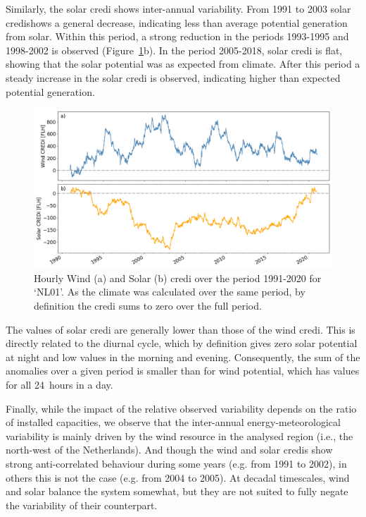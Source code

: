 \documentclass[a4paper,11pt]{extarticle}
\newcommand{\credi}[0]{{\sc credi}}
\newcommand{\sdi}[0]{{\sc solar credi}}
\newcommand{\wdi}[0]{{\sc wind credi}}
\begin{document}
Similarly, the \sdi{} shows inter-annual variability. 
From 1991 to 2003 \sdi shows a general decrease, indicating less than average potential generation from solar. 
Within this period, a strong reduction in the periods 1993-1995 and 1998-2002 is observed (Figure~\ref{fig:analysis_decadal}b). 
In the period 2005-2018, \sdi{} is flat, showing that the solar potential was as expected from climate. 
After this period a steady increase in the \sdi{} is observed, indicating higher than expected potential generation.

\begin{figure}[ht]
        \centering
        \includegraphics[width=\textwidth]{CREDI_interannual}
        \caption{
                Hourly Wind (a) and Solar (b) \credi{} over the period 1991-2020 for `NL01'. 
                As the climate was calculated over the same period, by definition the \credi{} sums to zero over the full period.}
        \label{fig:analysis_decadal}
\end{figure}

The values of \sdi{} are generally lower than those of the \wdi{}. 
This is directly related to the diurnal cycle, which by definition gives zero solar potential at night and low values in the morning and evening. 
Consequently, the sum of the anomalies over a given period is smaller than for wind potential, which has values for all 24~hours in a day.

Finally, while the impact of the relative observed variability depends on the ratio of installed capacities, we observe that the inter-annual energy-meteorological variability is mainly driven by the wind resource in the analysed region (i.e., the north-west of the Netherlands). 
And though the {\sc wind} and {\sc solar} \credi s show strong anti-correlated behaviour during some years (e.g. from 1991 to 2002), in others this is not the case (e.g. from 2004 to 2005). 
At decadal timescales, wind and solar balance the system somewhat, but they are not suited to fully negate the variability of their counterpart.
\end{document}
